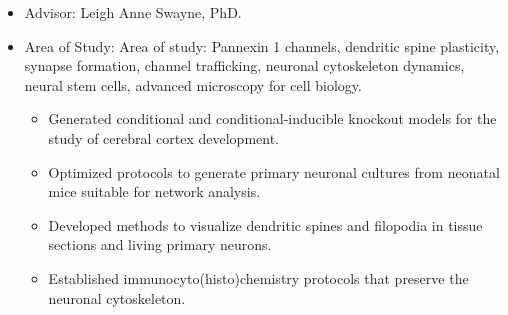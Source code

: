 \documentclass[10pt,a4paper,ragged2e]{altacv}
\begin{document}

\begin{fullwidth}
\makecvheader
\end{fullwidth}



\begin{itemize}
  \item {Advisor: Leigh Anne Swayne, PhD.}
  \item {Area of Study: Area of study: Pannexin 1 channels, dendritic spine plasticity, synapse formation, channel trafficking, neuronal cytoskeleton dynamics, neural stem cells, advanced microscopy for cell biology.}
  \begin{itemize}
      \item {Generated conditional and conditional-inducible knockout models for the study of cerebral cortex development.}
      \item {Optimized protocols to generate primary neuronal cultures from neonatal mice suitable for network analysis.}
      \item {Developed methods to visualize dendritic spines and filopodia in tissue sections and living primary neurons.}
      \item {Established immunocyto(histo)chemistry protocols that preserve the neuronal cytoskeleton.}
      \end{itemize}
\end{itemize}
\end{document}
